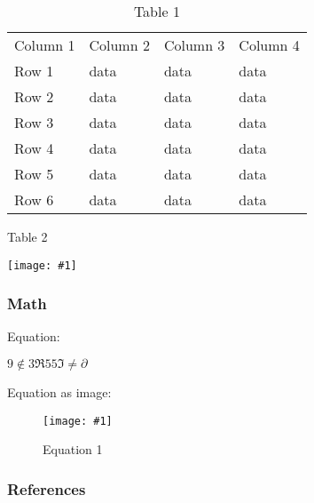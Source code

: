 \documentclass{article}
\newlength{\imgwidth}
\newcommand\scaledgraphics[2]{%
                
\settowidth{\imgwidth}{\texttt{[image: \#1]}}%
                
\setlength{\imgwidth}{\minof{\imgwidth}{#2\textwidth}}%
                
\texttt{[image: \#1]}%
                
}
\begin{document}
\begin{table}
\caption*{Table 1}\label{T66652301}

\begin{tabu} to \textwidth { |X|X|X|X| }
\hline



Column 1 & Column 2 & Column 3 & Column 4
 \\


Row 1 & data & data & data
 \\


Row 2 & data & data & data
 \\


Row 3 & data & data & data
 \\


Row 4 & data & data & data
 \\


Row 5 & data & data & data
 \\


Row 6 & data & data & data
 \\
\hline

\end{tabu}\end{table}


\begin{center}
\begin{table}
\caption*{Table 2}\label{F8966261}
\scaledgraphics{7c6e8240-04b3-4fa7-84fb-b3855c905735.jpg}{0.5}
\end{table}


\end{center}


\subsubsection{Math}\label{H225619}



Equation:


$9\notin3\mathfrak{\Re }55\mathfrak{\Im }\ne\partial$


Equation as image:

\begin{figure}
\scaledgraphics{090b27be-b68d-4325-9442-7a94408dc0d0.jpg}{0.5}
\caption*{Equation 1}\label{F9394491}
\end{figure}


\subsubsection{References}\label{H7100180}
\end{document}
